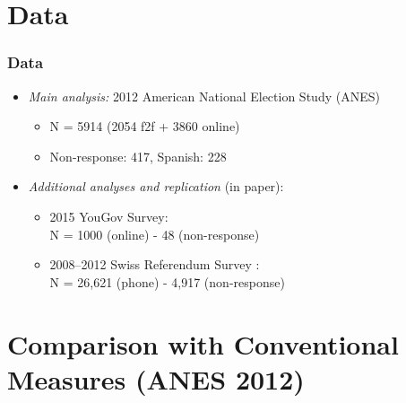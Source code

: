 \documentclass{beamer}
\begin{document}
\section{Data}

\begin{frame} %
\frametitle{Data}
	\begin{itemize}
	\item \emph{Main analysis:} 2012 American National Election Study (ANES)
		\begin{itemize}
		\item N = 5914 (2054 f2f + 3860 online)
		\item Non-response: 417, Spanish: 228
		\end{itemize}
		\vspace{1em}
	\item<2-> \emph{Additional analyses and replication} (in paper):
		\begin{itemize}
		\item<3-> 2015 YouGov Survey:\\N = 1000 (online) - 48 (non-response)
		\item<4-> 2008--2012 Swiss Referendum Survey \citep{colombo2016justifications}:\\N = 26,621 (phone) - 4,917 (non-response)
		\end{itemize}
	\end{itemize}
\end{frame}


\section{Comparison with Conventional Measures (ANES 2012)}
\end{document}
